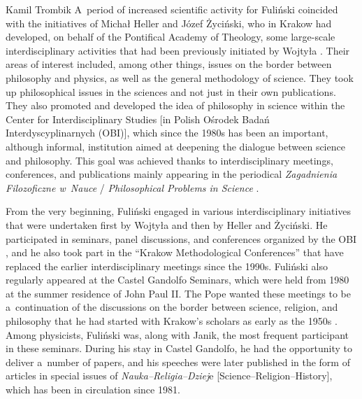 \begin{artengenv}{Kamil Trombik}
A~period of increased scientific activity for Fuliński coincided with the initiatives of Michał Heller and Józef Życiński, who in Krakow had developed, on behalf of the Pontifical Academy of Theology, some large-scale interdisciplinary activities that had been previously initiated by Wojtyła 
\parencite[][]{trombik_stworzyc_2022}. %
 Their areas of interest included, among other things, issues on the border between philosophy and physics, as well as the general methodology of science. They took up philosophical issues in the sciences and not just in their own publications. They also promoted and developed the idea of philosophy in science within the Center for Interdisciplinary Studies [in Polish Ośrodek Badań Interdyscyplinarnych (OBI)], which since the 1980s has been an important, although informal, institution aimed at deepening the dialogue between science and philosophy. This goal was achieved thanks to interdisciplinary meetings, conferences, and publications mainly appearing in the periodical \textit{Zagadnienia Filozoficzne w~Nauce} / \textit{Philosophical Problems in Science} 
\parencites[][]{heller_poczatki_2006}[][]{polak_philosophy_2019}[][]{trombik_origin_2019}.%




From the very beginning, Fuliński engaged in various interdisciplinary initiatives that were undertaken first by Wojtyła and then by Heller and Życiński. He participated in seminars, panel discussions, and conferences organized by the OBI 
\parencite[][]{liana_z_1999}, %
 and he also took part in the ``Krakow Methodological Conferences'' that have replaced the earlier interdisciplinary meetings since the 1990s. Fuliński also regularly appeared at the Castel Gandolfo Seminars, which were held from 1980 at the summer residence of John Paul II. The Pope wanted these meetings to be a~continuation of the discussions on the border between science, religion, and philosophy that he had started with Krakow's scholars as early as the 1950s 
\parencites[][p.5]{janik_nauka_1981}[][]{nowina_konopka_kontakty_2020}. %
 Among physicists, Fuliński was, along with Janik, the most frequent participant in these seminars. During his stay in Castel Gandolfo, he had the opportunity to deliver a~number of papers, and his speeches were later published in the form of articles in special issues of \textit{Nauka–Religia–Dziej}e [Science–Religion–History], which has been in circulation since 1981.




\end{artengenv}
